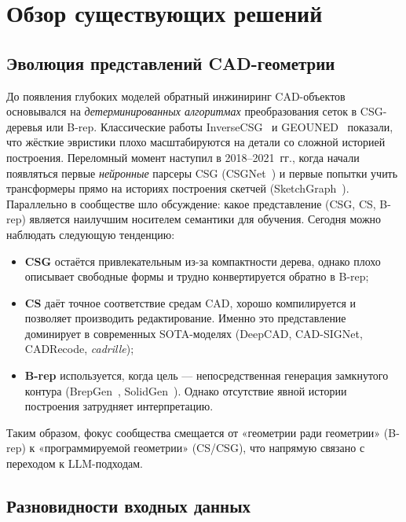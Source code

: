\section{Обзор существующих решений}
\label{sec:Chapter2} 

\subsection{Эволюция представлений CAD-геометрии}

До появления глубоких моделей обратный инжиниринг CAD-объектов
основывался на \textit{детерминированных алгоритмах} преобразования
сеток в CSG-деревья или B-rep. Классические работы
InverseCSG~\cite{inala18_inversecsg} и GEOUNED~\cite{catalan24_geouned}
показали, что жёсткие эвристики плохо масштабируются на детали со
сложной историей построения. Переломный момент наступил в
2018--2021~гг., когда начали появляться первые \textit{нейронные}
парсеры CSG (CSGNet~\cite{sharma18_csgnet}) и первые попытки учить
трансформеры прямо на историях построения скетчей
(SketchGraph~\cite{ganin21_cadlanguage}). Параллельно в сообществе
шло обсуждение: какое представление (CSG, CS, B-rep)
является наилучшим носителем семантики для обучения. Сегодня можно
наблюдать следующую тенденцию:

\begin{itemize}
	\item \textbf{CSG} остаётся привлекательным из-за компактности
	      дерева, однако плохо описывает свободные формы и трудно
	      конвертируется обратно в B-rep;
	\item \textbf{CS} даёт точное соответствие
	      средам CAD, хорошо компилируется и позволяет производить
	      редактирование. Именно это представление доминирует
	      в современных SOTA-моделях (DeepCAD, CAD-SIGNet, CADRecode,
	      \textit{cadrille});
	\item \textbf{B-rep} используется, когда цель — непосредственная
	      генерация замкнутого контура
	      (BrepGen~\cite{xu24_brepgen}, SolidGen~\cite{jayaraman22_solidgen}).
	      Однако отсутствие явной истории построения затрудняет
	      интерпретацию.
\end{itemize}

Таким образом, фокус сообщества смещается от «геометрии ради
геометрии» (B-rep) к «программируемой геометрии» (CS/CSG), что
напрямую связано с переходом к LLM-подходам.

\subsection{Разновидности входных данных}

